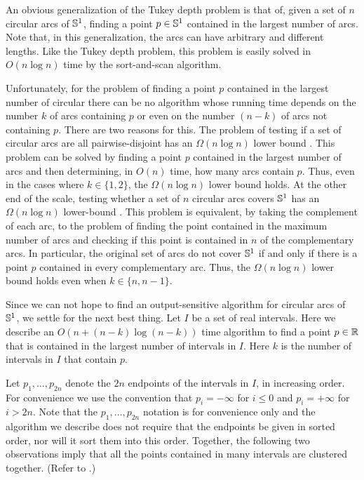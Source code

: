 \documentclass[12pt]{article}
\begin{document}
An obvious generalization of the Tukey depth problem is that of, given
a set of $n$ circular arcs of $\mathbb{S}^1$, finding a point $p\in\mathbb{S}^1$
contained in the largest number of arcs.  Note that, in this
generalization, the arcs can have arbitrary and different lengths.
Like the Tukey depth problem, this problem is easily solved in
$O(n\log n)$ time by the sort-and-scan algorithm.  

Unfortunately, for the problem of finding a point $p$ contained in the
largest number of circular there can be no algorithm whose running
time depends on the number $k$ of arcs containing $p$ or even on the
number $(n-k)$ of arcs not containing $p$. There are two reasons for
this.  The problem of testing if a set of circular arcs are all
pairwise-disjoint has an $\Omega(n\log n)$ lower bound \cite{b-o83}.
This problem can be solved by finding a point $p$ contained in the
largest number of arcs and then determining, in $O(n)$ time, how many
arcs contain $p$.  Thus, even in the cases where $k\in\{1, 2\}$, the
$\Omega(n\log n)$ lower bound holds.  At the other end of the scale,
testing whether a set of $n$ circular arcs covers $\mathbb{S}^1$ has an
$\Omega(n\log n)$ lower-bound \cite{b-o83}.  This problem is
equivalent, by taking the complement of each arc, to the problem of
finding the point contained in the maximum number of arcs and checking
if this point is contained in $n$ of the complementary arcs.  In
particular, the original set of arcs do not cover $\mathbb{S}^1$ if and only
if there is a point $p$ contained in every complementary arc.  Thus,
the $\Omega(n\log n)$ lower bound holds even when $k\in\{n,n-1\}$.

Since we can not hope to find an output-sensitive algorithm for
circular arcs of $\mathbb{S}^1$, we settle for the next best thing.  Let $I$
be a set of real intervals.  Here we describe an $O(n+(n-k)\log
(n-k))$ time algorithm to find a point $p\in\mathbb{R}$ that is contained in
the largest number of intervals in $I$.  Here $k$ is the number of
intervals in $I$ that contain $p$.  

Let $p_1,\ldots,p_{2n}$ denote the $2n$ endpoints of the intervals in
$I$, in increasing order. For convenience we use the convention that
$p_i = -\infty$ for $i\le 0$ and $p_i=+\infty$ for $i > 2n$.  Note
that the $p_1,\ldots,p_{2n}$ notation is for convenience only and the
algorithm we describe does not require that the endpoints be given in
sorted order, nor will it sort them into this order. Together, the
following two observations imply that all the points contained in many
intervals are clustered together. (Refer to .)
\end{document}
